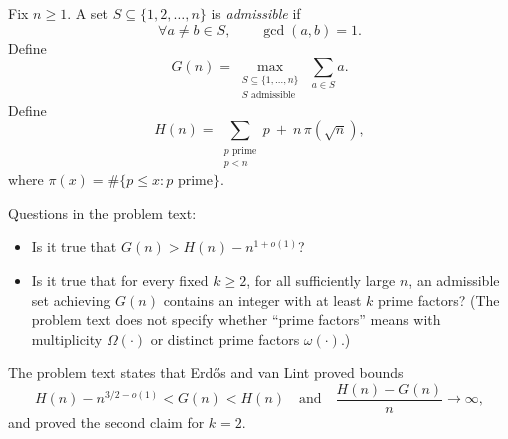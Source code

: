 Fix $n\ge 1$.
A set $S\subseteq\{1,2,\dots,n\}$ is \emph{admissible} if
\[
\forall a\ne b\in S,\qquad \gcd(a,b)=1.
\]
Define
\[
G(n)=\max_{\substack{S\subseteq\{1,\dots,n\}\\ S\text{ admissible}}}\ \sum_{a\in S} a.
\]
Define
\[
H(n)=\sum_{\substack{p\text{ prime}\\ p<n}} p\ +\ n\,\pi(\sqrt{n}),
\]
where $\pi(x)=\#\{p\le x: p\text{ prime}\}$.

Questions in the problem text:
\begin{itemize}
\item Is it true that $G(n)>H(n)-n^{1+o(1)}$?
\item Is it true that for every fixed $k\ge 2$, for all sufficiently large $n$, an admissible set achieving $G(n)$ contains an integer with at least $k$ prime factors? (The problem text does not specify whether ``prime factors'' means with multiplicity $\Omega(\cdot)$ or distinct prime factors $\omega(\cdot)$.)
\end{itemize}

The problem text states that Erd\H{o}s and van Lint proved bounds
\[
H(n)-n^{3/2-o(1)}<G(n)<H(n)
\quad\text{and}\quad
\frac{H(n)-G(n)}{n}\to\infty,
\]
and proved the second claim for $k=2$.
